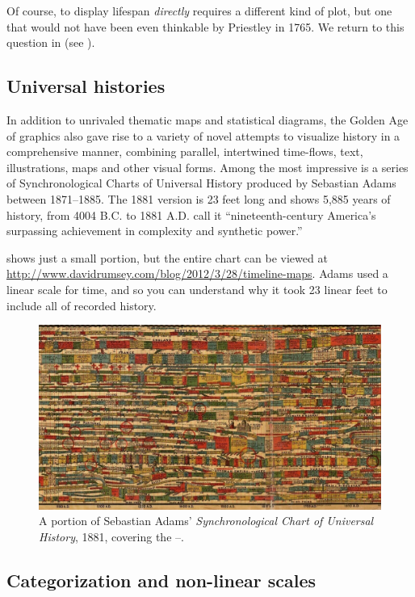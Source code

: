 Of course, to display lifespan \emph{directly} requires a different kind of plot, but one that
would not have been even thinkable by Priestley in 1765.  We return to this question in
 (see ).


\subsection{Universal histories}
In addition to unrivaled thematic maps and statistical diagrams, the Golden Age of graphics also
gave rise to a variety of novel attempts to visualize history in a comprehensive manner,
combining parallel, intertwined time-flows, text, illustrations, maps and other visual forms.
Among the most impressive is a series of Synchronological Charts of Universal History
produced by Sebastian Adams between 1871--1885.
The 1881 version is 23 feet long and shows 5,885 years of history, from 4004 B.C. to 1881 A.D.
\citet[p. 172]{RosenbergGrafton:2010} call it ``nineteenth-century America's surpassing achievement in complexity and synthetic power.'' 

 shows just a small portion, but the entire chart can be viewed at
\url{http://www.davidrumsey.com/blog/2012/3/28/timeline-maps}.  Adams used a linear scale for
time, and so you can understand why it took 23 linear feet to include all of recorded history.

\begin{figure}[!htb]
  \centering
  \includegraphics[width=\textwidth,clip]{fig/Adams1881-4}
  \caption{A portion of Sebastian Adams' \emph{Synchronological Chart of Universal History}, 1881,
  covering the --.
  }
  \label{fig:Adams1881}
\end{figure}

\subsection{Categorization and non-linear scales}

